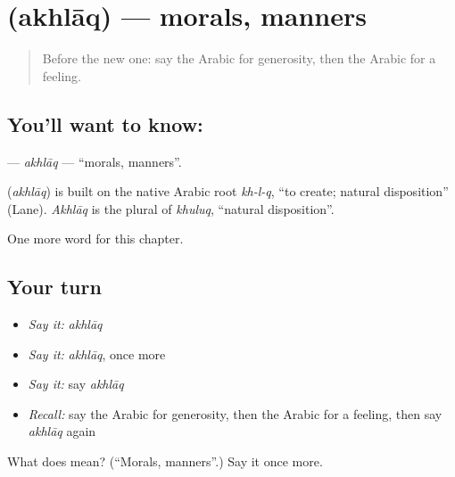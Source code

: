 \section[\texorpdfstring{\ar{أخلاق} (akhlāq)}{أخلاق (akhlāq)}]{ (akhlāq) — morals, manners}

\label{lesson:AR-C237-akhlaq}



\begin{quote}
Before the new one: say the Arabic for generosity, then the Arabic for a feeling.
\end{quote}

\subsection*{You'll want to know: }
\textbf{} — \emph{akhlāq} — \textquotedblleft{}morals, manners\textquotedblright{}.

\begin{cousinweb}
\textbf{} (\emph{akhlāq}) is built on the native Arabic root \emph{kh-l-q}, \textquotedblleft{}to create; natural disposition\textquotedblright{} (Lane). \emph{Akhlāq} is the plural of \emph{khuluq}, \textquotedblleft{}natural disposition\textquotedblright{}.
\end{cousinweb}

\begin{grammarlens}[title={What you've built}]
One more word for this chapter.
\end{grammarlens}

\subsection*{Your turn}
\begin{itemize}
\raggedright
  \item \emph{Say it:} \emph{akhlāq}
  \item \emph{Say it:} \emph{akhlāq}, once more
  \item \emph{Say it:} say \emph{akhlāq}
  \item \emph{Recall:} say the Arabic for generosity, then the Arabic for a feeling, then say \emph{akhlāq} again
\end{itemize}

\begin{tcolorbox}[breakable,colback=teal!4,colframe=teal!35!black,title={Before you move on}]
What does  mean? (\textquotedblleft{}Morals, manners\textquotedblright{}.) Say it once more.
\end{tcolorbox}
